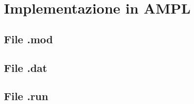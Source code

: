 


	\section{Implementazione in AMPL}
		\subsection{File .mod}
		
		\subsection{File .dat}

		\subsection{File .run}

		\newpage